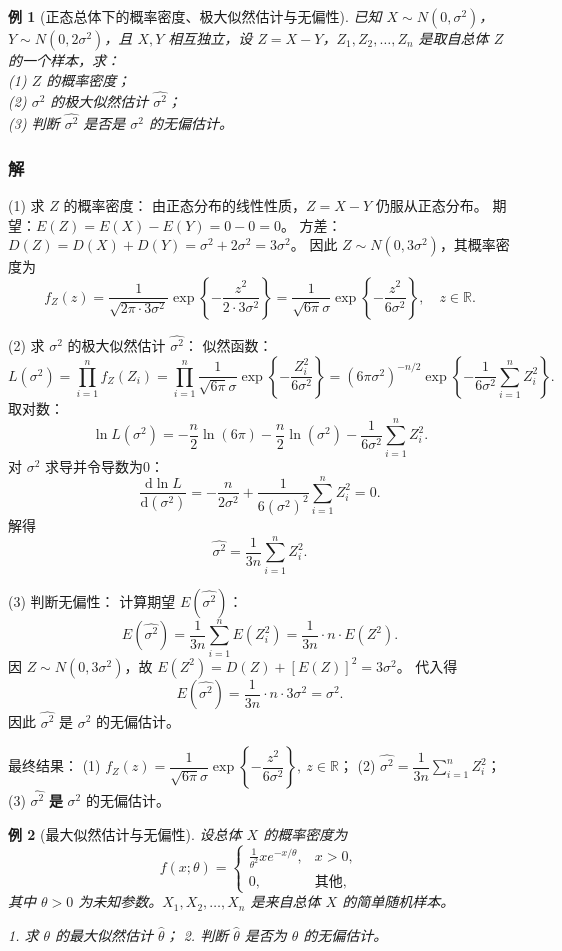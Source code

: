 \documentclass{book}
\newtheorem{example}{例}[subsection]
\begin{document}
\begin{example}[正态总体下的概率密度、极大似然估计与无偏性]
已知 $X \sim N(0,\sigma^2)$，$Y \sim N(0,2\sigma^2)$，且 $X,Y$ 相互独立，设 $Z = X - Y$，$Z_1,Z_2,\dots,Z_n$ 是取自总体 $Z$ 的一个样本，求：\\
(1) $Z$ 的概率密度；\\
(2) $\sigma^2$ 的极大似然估计 $\hat{\sigma^2}$；\\
(3) 判断 $\hat{\sigma^2}$ 是否是 $\sigma^2$ 的无偏估计。
\end{example}

\subsubsection{解}
(1) 求 $Z$ 的概率密度：
由正态分布的线性性质，$Z = X - Y$ 仍服从正态分布。
期望：$E(Z) = E(X) - E(Y) = 0 - 0 = 0$。
方差：$D(Z) = D(X) + D(Y) = \sigma^2 + 2\sigma^2 = 3\sigma^2$。
因此 $Z \sim N(0, 3\sigma^2)$，其概率密度为
\[
f_Z(z) = \frac{1}{\sqrt{2\pi \cdot 3\sigma^2}} \exp\left\{-\frac{z^2}{2 \cdot 3\sigma^2}\right\} = \frac{1}{\sqrt{6\pi}\sigma} \exp\left\{-\frac{z^2}{6\sigma^2}\right\},\quad z \in \mathbb{R}.
\]

(2) 求 $\sigma^2$ 的极大似然估计 $\hat{\sigma^2}$：
似然函数：
\[
L(\sigma^2) = \prod_{i=1}^n f_Z(Z_i) = \prod_{i=1}^n \frac{1}{\sqrt{6\pi}\sigma} \exp\left\{-\frac{Z_i^2}{6\sigma^2}\right\}
= (6\pi\sigma^2)^{-n/2} \exp\left\{-\frac{1}{6\sigma^2} \sum_{i=1}^n Z_i^2\right\}.
\]
取对数：
\[
\ln L(\sigma^2) = -\frac{n}{2}\ln(6\pi) - \frac{n}{2}\ln(\sigma^2) - \frac{1}{6\sigma^2} \sum_{i=1}^n Z_i^2.
\]
对 $\sigma^2$ 求导并令导数为0：
\[
\frac{\mathrm{d}\ln L}{\mathrm{d}(\sigma^2)} = -\frac{n}{2\sigma^2} + \frac{1}{6(\sigma^2)^2} \sum_{i=1}^n Z_i^2 = 0.
\]
解得
\[
\hat{\sigma^2} = \frac{1}{3n} \sum_{i=1}^n Z_i^2.
\]

(3) 判断无偏性：
计算期望 $E(\hat{\sigma^2})$：
\[
E(\hat{\sigma^2}) = \frac{1}{3n} \sum_{i=1}^n E(Z_i^2) = \frac{1}{3n} \cdot n \cdot E(Z^2).
\]
因 $Z \sim N(0, 3\sigma^2)$，故 $E(Z^2) = D(Z) + [E(Z)]^2 = 3\sigma^2$。
代入得
\[
E(\hat{\sigma^2}) = \frac{1}{3n} \cdot n \cdot 3\sigma^2 = \sigma^2.
\]
因此 $\hat{\sigma^2}$ 是 $\sigma^2$ 的无偏估计。

最终结果：
(1) $\boxed{f_Z(z) = \dfrac{1}{\sqrt{6\pi}\sigma} \exp\left\{-\dfrac{z^2}{6\sigma^2}\right\},\ z \in \mathbb{R}}$；
(2) $\boxed{\hat{\sigma^2} = \dfrac{1}{3n} \sum_{i=1}^n Z_i^2}$；
(3) $\hat{\sigma^2}$ \textbf{是} $\sigma^2$ 的无偏估计。

\begin{example}[最大似然估计与无偏性]
设总体 $X$ 的概率密度为
\[
f(x;\theta) = 
\begin{cases}
\displaystyle \frac{1}{\theta^2} x e^{-x/\theta}, & x>0, \\
0, & \text{其他},
\end{cases}
\]
其中 $\theta > 0$ 为未知参数。$X_1,X_2,\dots,X_n$ 是来自总体 $X$ 的简单随机样本。

1. 求 $\theta$ 的最大似然估计 $\hat\theta$；
2. 判断 $\hat\theta$ 是否为 $\theta$ 的无偏估计。
\end{example}
\end{document}
